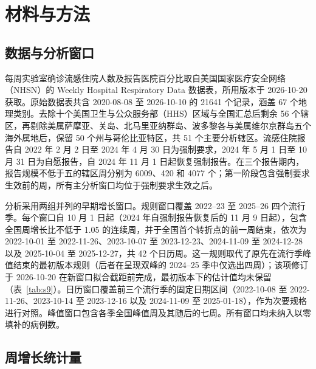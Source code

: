 \section{材料与方法}
\label{sec:methods}

\subsection{数据与分析窗口}
\label{sec:meth-data}

每周实验室确诊流感住院人数及报告医院百分比取自美国国家医疗安全网络（NHSN）的 Weekly Hospital Respiratory Data 数据表\citep{cdc2026nhsn}，所用版本于 2026-10-20 获取。原始数据表共含 2020-08-08 至 2026-10-10 的 21641 个记录，涵盖 67 个地理类别。去除十个美国卫生与公众服务部（HHS）区域与全国汇总后剩余 56 个辖区，再剔除美属萨摩亚、关岛、北马里亚纳群岛、波多黎各与美属维尔京群岛五个海外属地后，保留 50 个州与哥伦比亚特区，共 51 个主要分析辖区。流感住院报告自 2022 年 2 月 2 日至 2024 年 4 月 30 日为强制要求\citep{cdc2022flusight, frutos2025evaluation}，2024 年 5 月 1 日至 10 月 31 日为自愿报告，自 2024 年 11 月 1 日起恢复强制报告\citep{cms2024reporting}。在三个报告期内，报告规模不低于五的辖区周分别为 6009、420 和 4077 个；第一阶段包含强制要求生效前的周，所有主分析窗口均位于强制要求生效之后。

分析采用两组并列的早期增长窗口。规则窗口覆盖 2022--23 至 2025--26 四个流行季。每个窗口自 10 月 1 日起（2024 年自强制报告恢复后的 11 月 9 日起），包含全国周增长比不低于 1.05 的连续周，并于全国首个转折点的前一周结束，依次为 2022-10-01 至 2022-11-26、2023-10-07 至 2023-12-23、2024-11-09 至 2024-12-28 以及 2025-10-04 至 2025-12-27，共 42 个日历周。这一规则取代了原先在流行季峰值结束的最初版本规则（后者在呈现双峰的 2024--25 季中仅选出四周）；该项修订于 2026-10-20 在新窗口拟合截距前完成，最初版本下的估计值均未保留（表~\ref{tab:s9}）。日历窗口覆盖前三个流行季的固定日期区间（2022-10-08 至 2022-11-26、2023-10-14 至 2023-12-16 以及 2024-11-09 至 2025-01-18），作为次要规格进行对照。峰值窗口包含各季全国峰值周及其随后的七周。所有窗口均未纳入以零填补的病例数。

\subsection{周增长统计量}
\label{sec:meth-stats}

